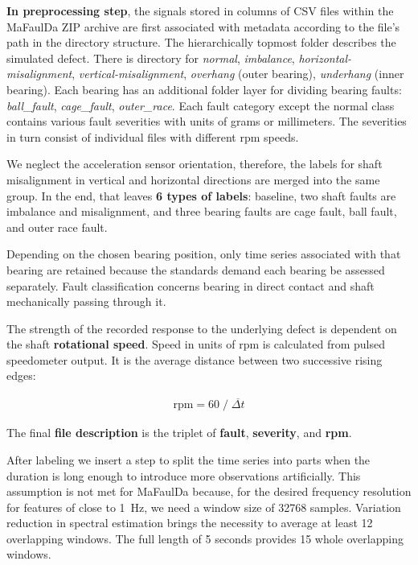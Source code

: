 \textbf{In preprocessing step}, the signals stored in columns of CSV files within the MaFaulDa ZIP archive are first associated with metadata according to the file's path in the directory structure. The hierarchically topmost folder describes the simulated defect. There is directory for \emph{normal}, \emph{imbalance}, \emph{horizontal-misalignment}, \emph{vertical-misalignment}, \emph{overhang} (outer bearing), \emph{underhang} (inner bearing). Each bearing has an additional folder layer for dividing bearing faults: \emph{ball\_fault}, \emph{cage\_fault}, \emph{outer\_race}. Each fault category except the normal class contains various fault severities with units of grams or millimeters. The severities in turn consist of individual files with different rpm speeds. 

We neglect the acceleration sensor orientation, therefore, the labels for shaft misalignment in vertical and horizontal directions are merged into the same group. In the end, that leaves \textbf{6 types of labels}: baseline, two shaft faults are imbalance and misalignment, and three bearing faults are cage fault, ball fault, and outer race fault.  

Depending on the chosen bearing position, only time series associated with that bearing are retained because the standards demand each bearing be assessed separately. Fault classification concerns bearing in direct contact and shaft mechanically passing through it.

The strength of the recorded response to the underlying defect is dependent on the shaft \textbf{rotational speed}. Speed in units of rpm is calculated from pulsed speedometer output. It is the average distance between two successive rising edges:
\begin{ceqn}\begin{align}
\mathrm{rpm} = 60 \;/\; \overline{\Delta t}
\end{align}\end{ceqn}

The final \textbf{file description} is the triplet of \textbf{fault}, \textbf{severity}, and \textbf{rpm}.

After labeling we insert a step to split the time series into parts when the duration is long enough to introduce more observations artificially. This assumption is not met for MaFaulDa because, for the desired frequency resolution for features of close to 1~Hz, we need a window size of 32768 samples. Variation reduction in spectral estimation brings the necessity to average at least 12 overlapping windows. The full length of 5 seconds provides 15 whole overlapping windows. 

